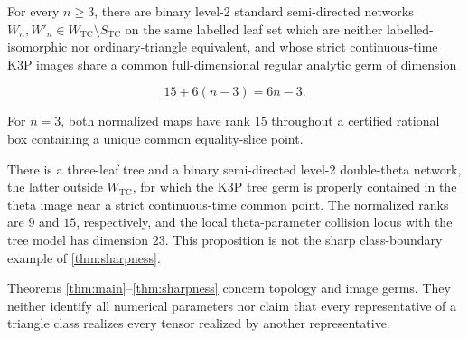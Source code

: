 \begin{theorem}\label{thm:sharpness}
For every \(n\ge3\), there are binary level-2 standard semi-directed networks
\(W_n,W'_n\in W_{\mathrm{TC}}\setminus S_{\mathrm{TC}}\) on the same labelled
leaf set which are neither labelled-isomorphic nor ordinary-triangle
equivalent, and whose strict continuous-time K3P images share a common
full-dimensional regular analytic germ of dimension

\[
 15+6(n-3)=6n-3.
\]

For \(n=3\), both normalized maps have rank \(15\) throughout a certified
rational box containing a unique common equality-slice point.
\end{theorem}

\begin{proposition}\label{prop:outer}
There is a three-leaf tree and a binary semi-directed level-2 double-theta
network, the latter outside \(W_{\mathrm{TC}}\), for which the K3P tree germ
is properly contained in the theta image near a strict continuous-time common
point.  The normalized ranks are \(9\) and \(15\), respectively, and the
local theta-parameter collision locus with the tree model has dimension
\(23\).  This proposition is not the sharp class-boundary example of
\cref{thm:sharpness}.
\end{proposition}

Theorems \ref{thm:main}--\ref{thm:sharpness} concern topology and image
germs.  They neither identify all numerical parameters nor claim that every
representative of a triangle class realizes every tensor realized by another
representative.
